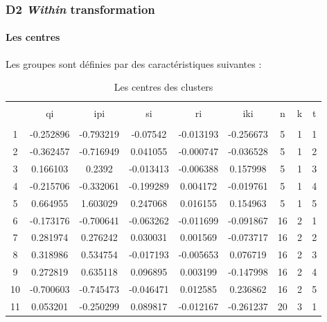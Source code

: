 \documentclass[11pt,]{article}
\let\oldparagraph\paragraph
\renewcommand{\paragraph}[1]{\oldparagraph{#1}\mbox{}}
\begin{document}
\FloatBarrier

\hypertarget{d2-within-transformation}{%
\subsubsection{\texorpdfstring{D2 \emph{Within}
transformation}{D2 Within transformation}}\label{d2-within-transformation}}

\hypertarget{les-centres}{%
\paragraph{Les centres}\label{les-centres}}

Les groupes sont définies par des caractéristiques suivantes :

\FloatBarrier

\begin{table}[!htbp] \centering 
  \caption{Les centres des clusters} 
  \label{} 
\begin{tabular}{@{\extracolsep{5pt}} ccccccccc} 
\\[-1.8ex]\hline 
\hline \\[-1.8ex] 
 & qi & ipi & si & ri & iki & n & k & t \\ 
\hline \\[-1.8ex] 
1 & -0.252896 & -0.793219 & -0.07542 & -0.013193 & -0.256673 & 5 & 1 & 1 \\ 
2 & -0.362457 & -0.716949 & 0.041055 & -0.000747 & -0.036528 & 5 & 1 & 2 \\ 
3 & 0.166103 & 0.2392 & -0.013413 & -0.006388 & 0.157998 & 5 & 1 & 3 \\ 
4 & -0.215706 & -0.332061 & -0.199289 & 0.004172 & -0.019761 & 5 & 1 & 4 \\ 
5 & 0.664955 & 1.603029 & 0.247068 & 0.016155 & 0.154963 & 5 & 1 & 5 \\ 
6 & -0.173176 & -0.700641 & -0.063262 & -0.011699 & -0.091867 & 16 & 2 & 1 \\ 
7 & 0.281974 & 0.276242 & 0.030031 & 0.001569 & -0.073717 & 16 & 2 & 2 \\ 
8 & 0.318986 & 0.534754 & -0.017193 & -0.005653 & 0.076719 & 16 & 2 & 3 \\ 
9 & 0.272819 & 0.635118 & 0.096895 & 0.003199 & -0.147998 & 16 & 2 & 4 \\ 
10 & -0.700603 & -0.745473 & -0.046471 & 0.012585 & 0.236862 & 16 & 2 & 5 \\ 
11 & 0.053201 & -0.250299 & 0.089817 & -0.012167 & -0.261237 & 20 & 3 & 1 \\ 

\end{tabular}
\end{table}
\end{document}
